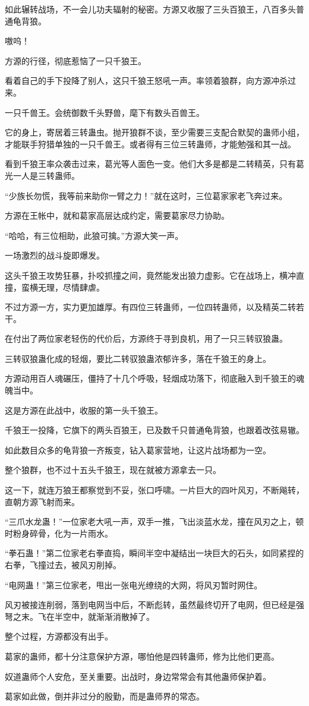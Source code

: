 \begin{this_body}
如此辗转战场，不一会儿功夫辐射的秘密。方源又收服了三头百狼王，八百多头普通龟背狼。

嗷呜！

方源的行径，彻底惹恼了一只千狼王。

看着自己的手下投降了别人，这只千狼王怒吼一声。率领着狼群，向方源冲杀过来。

一只千兽王。会统御数千头野兽，麾下有数头百兽王。

它的身上，寄居着三转蛊虫。抛开狼群不谈，至少需要三支配合默契的蛊师小组，才能联手狩猎单独的一只千兽王。或者得有三位三转蛊师，才能勉强和其一战。

看到千狼王率众袭击过来，葛光等人面色一变。他们大多是都是二转精英，只有葛光一人是三转蛊师。

“少族长勿慌，我等前来助你一臂之力！”就在这时，三位葛家家老飞奔过来。

方源在王帐中，就和葛家高层达成约定，需要葛家尽力协助。

“哈哈，有三位相助，此狼可擒。”方源大笑一声。

一场激烈的战斗旋即爆发。

这头千狼王攻势狂暴，扑咬抓撞之间，竟然能发出狼力虚影。它在战场上，横冲直撞，蛮横无理，尽情肆虐。

不过方源一方，实力更加雄厚。有四位三转蛊师，一位四转蛊师，以及精英二转若干。

在付出了两位家老轻伤的代价后，方源终于寻到良机，用了一只三转驭狼蛊。

三转驭狼蛊化成的轻烟，要比二转驭狼蛊浓郁许多，落在千狼王的身上。

方源动用百人魂碾压，僵持了十几个呼吸，轻烟成功落下，彻底融入到千狼王的魂魄当中。

这是方源在此战中，收服的第一头千狼王。

千狼王一投降，它旗下的两头百狼王，已及数千只普通龟背狼，也跟着改弦易辙。

如此数目众多的龟背狼一齐叛变，钻入葛家营地，让这片战场都为一空。

整个狼群，也不过十五头千狼王，现在就被方源拿去一只。

这一下，就连万狼王都察觉到不妥，张口呼啸。一片巨大的四叶风刃，不断飚转，直朝方源飞射而来。

“三爪水龙蛊！”一位家老大吼一声，双手一推，飞出淡蓝水龙，撞在风刃之上，顿时粉身碎骨，化为一片雨水。

“拳石蛊！”第二位家老右拳直捣，瞬间半空中凝结出一块巨大的石头，如同紧捏的右拳，飞撞过去，被风刃削掉。

“电网蛊！”第三位家老，甩出一张电光缭绕的大网，将风刃暂时网住。

风刃被接连削弱，落到电网当中后，不断彪转，虽然最终切开了电网，但已经是强弩之末。飞在半空中，就渐渐消散掉了。

整个过程，方源都没有出手。

葛家的蛊师，都十分注意保护方源，哪怕他是四转蛊师，修为比他们更高。

奴道蛊师个人安危，至关重要。出战时，身边常常会有其他蛊师保护着。

葛家如此做，倒并非过分的殷勤，而是蛊师界的常态。

\end{this_body}


